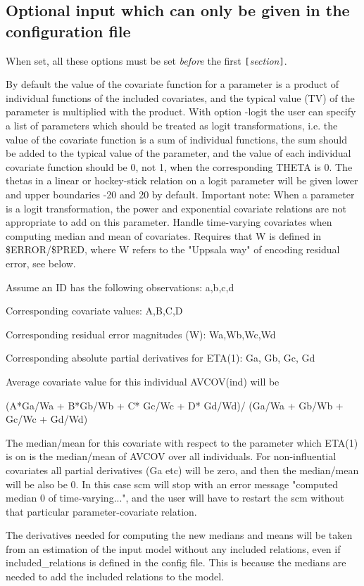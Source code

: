 \subsection{Optional input which can only be given in the configuration file}
When set, all these options must be set \emph{before} the first 
\verb|[|\emph{section}\verb|]|.

\begin{optionlist}
By default the value of the covariate function for a parameter is a  product of individual functions of the included covariates, and the typical value (TV) of the parameter is multiplied with the product. With option -logit the user can specify a list of parameters which should be treated as logit transformations, i.e. the value of the covariate function is a sum of individual functions, the sum should be added to the typical value of the parameter, and the value of each individual covariate function should be 0, not 1, when the corresponding THETA is 0. The thetas in a linear or hockey-stick relation on a logit parameter will be given lower and upper boundaries -20 and 20 by default. Important note: When a parameter is a logit transformation, the power and exponential covariate relations are not appropriate to add on this parameter. 
\nextopt
{}
Handle time-varying covariates when computing median and mean of covariates. Requires that W is defined in \$ERROR/\$PRED,
where W refers to the "Uppsala way" of encoding residual error, see below.

Assume an ID has the following observations: a,b,c,d

Corresponding covariate values: A,B,C,D

Corresponding residual error magnitudes (W): Wa,Wb,Wc,Wd

Corresponding absolute partial derivatives for ETA(1): Ga, Gb, Gc, Gd

Average covariate value for this individual  AVCOV(ind) will be

(A*Ga/Wa + B*Gb/Wb + C* Gc/Wc + D* Gd/Wd)/
(Ga/Wa + Gb/Wb + Gc/Wc + Gd/Wd)

The median/mean for this covariate with respect to the parameter which ETA(1) is on is the median/mean of AVCOV over all individuals.
For non-influential covariates all partial derivatives (Ga etc) will be zero, and then
the median/mean will be also be 0. In this case scm will stop with an error message "computed median 0 of time-varying...",
and the user will have to restart the scm without that particular parameter-covariate relation.

The derivatives needed for computing the new medians and means will be taken from an estimation of the input model without any included relations, even if included\_relations is defined in the config file. This is because the medians are needed to add the included relations to the model.\\


\nextopt
\end{optionlist}

